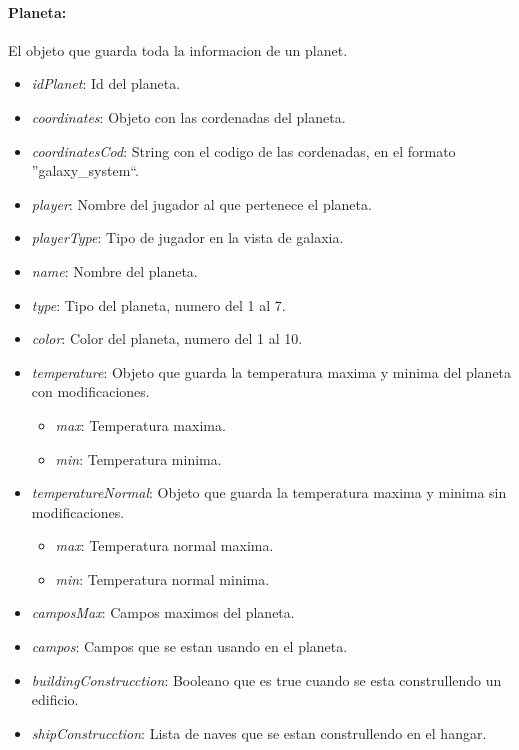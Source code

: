 \documentclass{article}
\begin{document}
\paragraph{Planeta:} El objeto que guarda toda la informacion de un planet.
\vspace{-5mm}
\begin{itemize}[noitemsep]
    \item \textit{idPlanet}: Id del planeta.
    \item \textit{coordinates}: Objeto con las cordenadas del planeta.
    \item \textit{coordinatesCod}: String con el codigo de las cordenadas, en el formato ''galaxy\_system``.
    \item \textit{player}: Nombre del jugador al que pertenece el planeta.
    \item \textit{playerType}: Tipo de jugador en la vista de galaxia.
    \item \textit{name}: Nombre del planeta.
    \item \textit{type}: Tipo del planeta, numero del 1 al 7.
    \item \textit{color}: Color del planeta, numero del 1 al 10.
    \item \textit{temperature}: Objeto que guarda la temperatura maxima y minima del planeta con modificaciones.
    \begin{itemize}[noitemsep]
        \item \textit{max}: Temperatura maxima.
        \item \textit{min}: Temperatura minima.
    \end{itemize}
    \item \textit{temperatureNormal}: Objeto que guarda la temperatura maxima y minima sin modificaciones.
    \begin{itemize}[noitemsep]
        \item \textit{max}: Temperatura normal maxima.
        \item \textit{min}: Temperatura normal minima.
    \end{itemize}
    \item \textit{camposMax}: Campos maximos del planeta.
    \item \textit{campos}: Campos que se estan usando en el planeta.
    \item \textit{buildingConstrucction}: Booleano que es true cuando se esta construllendo un edificio.
    \item \textit{shipConstrucction}: Lista de naves que se estan construllendo en el hangar.

\end{itemize}
\end{document}
